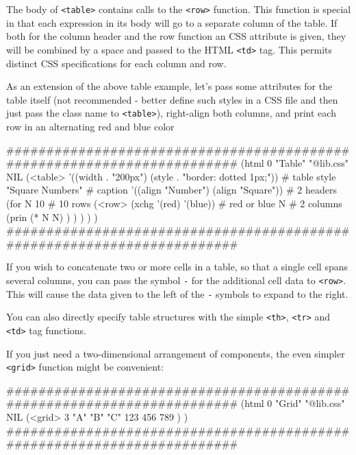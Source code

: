 The body of \texttt{<table>} contains calls to the \texttt{<row>} function. This
function is special in that each expression in its body will go to a
separate column of the table. If both for the column header and the row
function an CSS attribute is given, they will be combined by a space and
passed to the HTML \texttt{<td>} tag. This permits distinct CSS specifications
for each column and row.

As an extension of the above table example, let's pass some attributes
for the table itself (not recommended - better define such styles in a
CSS file and then just pass the class name to \texttt{<table>}), right-align
both columns, and print each row in an alternating red and blue color


\begin{wideverbatim}
########################################################################
(html 0 "Table" "@lib.css" NIL
   (<table>
      '((width . "200px") (style . "border: dotted 1px;"))    # table style
      "Square Numbers"                                        # caption
      '((align "Number") (align "Square"))                    # 2 headers
      (for N 10                                                  # 10 rows
         (<row> (xchg '(red) '(blue))                         # red or blue
            N                                                 # 2 columns
            (prin (* N N) ) ) ) ) )
########################################################################
\end{wideverbatim}

If you wish to concatenate two or more cells in a table, so that a
single cell spans several columns, you can pass the symbol  \texttt{-}  for the
additional cell data to \texttt{<row>}. This will cause the data given to the
left of the  \texttt{-}  symbols to expand to the right.

You can also directly specify table structures with the simple \texttt{<th>},
\texttt{<tr>} and \texttt{<td>} tag functions.

If you just need a two-dimensional arrangement of components, the even
simpler \texttt{<grid>} function might be convenient:


\begin{wideverbatim}
########################################################################
(html 0 "Grid" "@lib.css" NIL
   (<grid> 3
      "A" "B" "C"
      123 456 789 ) )
########################################################################
\end{wideverbatim}

